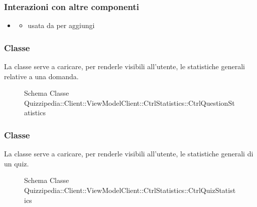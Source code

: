 \subsubsection{Interazioni con altre componenti}
\begin{itemize}
\item {}
\begin{itemize}
\item usata da  per aggiungi
\end{itemize}
\end{itemize}
\subsubsection{Classe }
La classe serve a caricare, per renderle visibili all'utente, le statistiche generali relative a una domanda.
\begin{figure}[H]
\centering
\noindent{}
\caption[Schema Classe CtrlQuestionStatistics]{Schema Classe Quizzipedia::Client::ViewModelClient::CtrlStatistics::CtrlQuestionStatistics}
\end{figure}
\subsubsection{Classe }
La classe serve a caricare, per renderle visibili all'utente, le statistiche generali di un quiz.
\begin{figure}[H]
\centering
\noindent{}
\caption[Schema Classe CtrlQuizStatistics]{Schema Classe Quizzipedia::Client::ViewModelClient::CtrlStatistics::CtrlQuizStatistics}
\end{figure}
